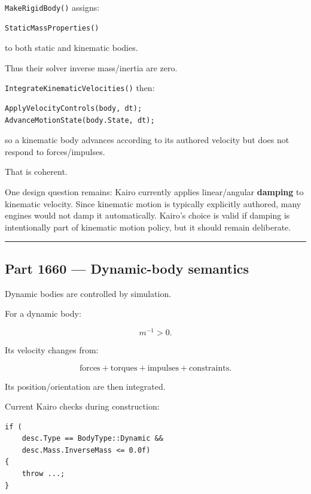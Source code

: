 \hypertarget{06-engine-ii-ch037-current-kairo-semantics}{}

\texttt{MakeRigidBody()} assigns:

\begin{verbatim}
StaticMassProperties()
\end{verbatim}

to both static and kinematic bodies.

Thus their solver inverse mass/inertia are zero.

\texttt{IntegrateKinematicVelocities()} then:

\begin{verbatim}
ApplyVelocityControls(body, dt);
AdvanceMotionState(body.State, dt);
\end{verbatim}

so a kinematic body advances according to its authored velocity but does not respond to forces/impulses.

That is coherent.

One design question remains: Kairo currently applies linear/angular \textbf{damping} to kinematic velocity. Since kinematic motion is typically explicitly authored, many engines would not damp it automatically. Kairo's choice is valid if damping is intentionally part of kinematic motion policy, but it should remain deliberate.

\begin{center}\rule{0.5\linewidth}{0.5pt}\end{center}

\subsection{Part 1660 --- Dynamic-body semantics}\label{06-engine-ii-ch037-part-1660-dynamic-body-semantics}

\hypertarget{06-engine-ii-ch037-part-1660-dynamic-body-semantics}{}

Dynamic bodies are controlled by simulation.

For a dynamic body:

\[
m^{-1}>0.
\]

Its velocity changes from:

\[
\text{forces}
+
\text{torques}
+
\text{impulses}
+
\text{constraints}.
\]

Its position/orientation are then integrated.

Current Kairo checks during construction:

\begin{verbatim}
if (
    desc.Type == BodyType::Dynamic &&
    desc.Mass.InverseMass <= 0.0f)
{
    throw ...;
}
\end{verbatim}

